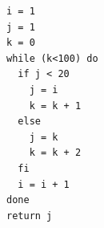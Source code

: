 \documentclass[dvipdfmx]{jarticle}
\begin{document}
\begin{Verbatim}
i = 1
j = 1
k = 0
while (k<100) do
  if j < 20
    j = i
    k = k + 1
  else
    j = k
    k = k + 2
  fi
  i = i + 1
done
return j
\end{Verbatim}
\end{document}
